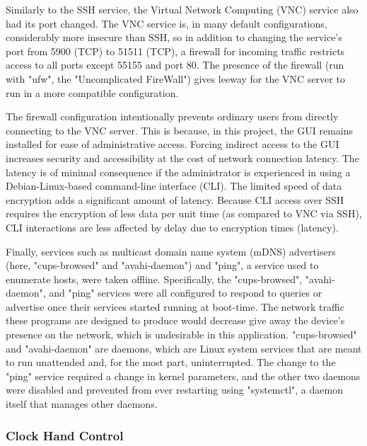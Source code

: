 \documentclass[11pt]{article}
\begin{document}
Similarly to the SSH service, the Virtual Network Computing (VNC) service also had its port changed.
The VNC service is, in many default configurations, considerably more insecure than SSH, so in addition to changing the service's port from 5900 (TCP) to 51511 (TCP), a firewall for incoming traffic restricts access to all ports except 55155 and port 80. 
The presence of the firewall (run with "ufw", the "Uncomplicated FireWall") gives leeway for the VNC server to run in a more compatible configuration. 

The firewall configuration intentionally prevents ordinary users from directly connecting to the VNC server. 
This is because, in this project, the GUI remains installed for ease of administrative access. Forcing indirect access to the GUI increases security and accessibility at the cost of network connection latency. 
The latency is of minimal consequence if the administrator is experienced in using a Debian-Linux-based command-line interface (CLI). 
The limited speed of data encryption adds a significant amount of latency. 
Because CLI access over SSH requires the encryption of less data per unit time (as compared to VNC via SSH), CLI interactions are less affected by delay due to encryption times (latency).

Finally, services such as multicast domain name system (mDNS) advertisers (here, "cups-browsed" and "avahi-daemon") and "ping", a service used to enumerate hosts, were taken offline. 
Specifically, the "cups-browsed", "avahi-daemon", and "ping" services were all configured to respond to queries or advertise once their services started running at boot-time. 
The network traffic these programs are designed to produce would decrease give away the device's presence on the network, which is undesirable in this application.
"cups-browsed" and "avahi-daemon" are daemons, which are Linux system services that are meant to run unattended and, for the most part, uninterrupted. The change to the "ping" service required a change in kernel parameters, and the other two daemons were disabled and prevented from ever restarting using "systemctl", a daemon itself that manages other daemons. 

\subsubsection{Clock Hand Control}
\label{AnalogDesign}

\end{document}
